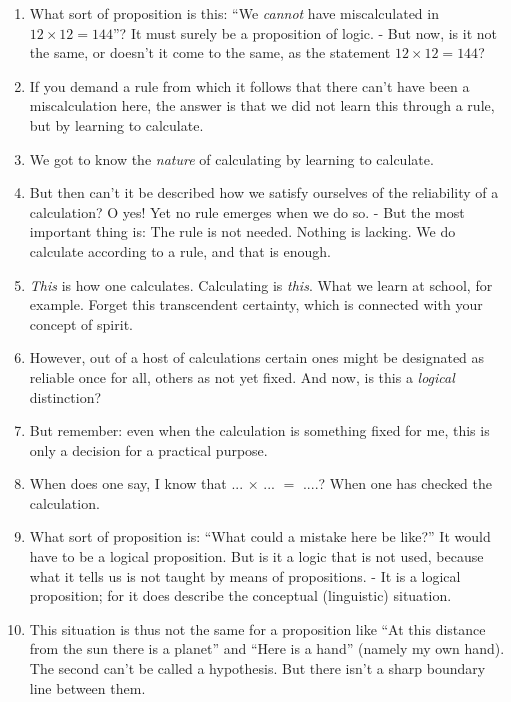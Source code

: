 \documentclass{book}
\begin{document}
\begin{enumerate}
\item
What sort of proposition is this: ``We \emph{cannot} have miscalculated in
$12{\times}12=144$''? It must surely be a proposition of logic. - But now, is
it not the same, or doesn't it come to the same, as the statement
$12{\times}12=144$?

\item
If you demand a rule from which it follows that there can't have been a
miscalculation here, the answer is that we did not learn this through a rule,
but by learning to calculate.

\item
We got to know the \emph{nature} of calculating by learning to calculate.

\item
But then can't it be described how we satisfy ourselves of the reliability of a
calculation? O yes! Yet no rule emerges when we do so. - But the most important
thing is: The rule is not needed. Nothing is lacking. We do calculate according
to a rule, and that is enough.

\item
\emph{This} is how one calculates. Calculating is \emph{this}. What we learn at
school, for example. Forget this transcendent certainty, which is connected
with your concept of spirit.

\item
However, out of a host of calculations certain ones might be designated as
reliable once for all, others as not yet fixed. And now, is this a
\emph{logical} distinction?

\item
But remember: even when the calculation is something fixed for me, this is only
a decision for a practical purpose.

\item
When does one say, I know that ... $\times$ ... $=$ ....? When one has checked
the calculation.

\item
What sort of proposition is: ``What could a mistake here be like?'' It would
have to be a logical proposition. But is it a logic that is not used, because
what it tells us is not taught by means of propositions. - It is a logical
proposition; for it does describe the conceptual (linguistic) situation.

\item
This situation is thus not the same for a proposition like ``At this distance
from the sun there is a planet'' and ``Here is a hand'' (namely my own hand).
The second can't be called a hypothesis. But there isn't a sharp boundary line
between them.


\end{enumerate}
\end{document}
